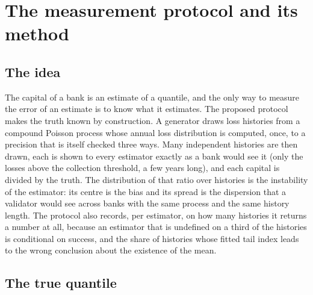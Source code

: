 \section{The measurement protocol and its method}
\label{sec:proposed-method}

\subsection{The idea}
\label{sec:pm-idea}

The capital of a bank is an estimate of a quantile, and the only way to measure the error of an estimate is to know what it estimates. The proposed protocol makes the truth known by construction. A generator draws loss histories from a compound Poisson process whose annual loss distribution
is computed, once, to a precision that is itself checked three ways. Many independent histories are then drawn, each is shown to every estimator exactly as a bank would see it (only the losses above the collection threshold, a few years long), and each capital is divided by the truth. The distribution of
that ratio over histories is the instability of the estimator: its centre is the bias and its spread is the dispersion that a validator would see across banks with the same process and the same history length. The protocol also records, per estimator, on how many histories it returns a number at all, because an estimator that is
undefined on a third of the histories is conditional on success, and the share of histories whose fitted tail index leads to the wrong conclusion about the existence of the mean.

\subsection{The true quantile}
\label{sec:pm-truth}

